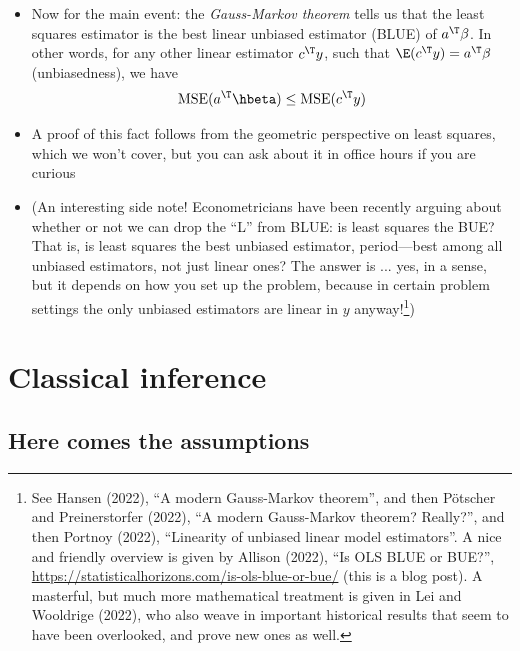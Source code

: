 \documentclass{article}
\begin{document}
\begin{itemize}
\item Now for the main event: the \emph{Gauss-Markov theorem} tells us that
  the least squares estimator is the best linear unbiased estimator (BLUE) of
  $a^\T \beta$. In other words, for any other linear estimator $c^\T y$, such
  that $\E(c^\T y) = a^\T \beta$ (unbiasedness), we have  
  \[
  \MSE(a^\T \hbeta) \leq \MSE(c^\T y)
  \]

\item A proof of this fact follows from the geometric perspective on least
  squares, which we won't cover, but you can ask about it in office hours if you
  are curious  

\item (An interesting side note! Econometricians have been recently arguing about 
  whether or not we can drop the ``L'' from BLUE: is least squares the BUE? That
  is, is least squares the best unbiased estimator, period---best among all
  unbiased estimators, not just linear ones? The answer is ... yes, in a sense,
  but it depends on how you set up the problem, because in certain problem
  settings the only unbiased estimators are linear in $y$ anyway!\footnote{See
    Hansen (2022), ``A modern Gauss-Markov theorem'', and then P{\"o}tscher and
    Preinerstorfer (2022), ``A modern Gauss-Markov theorem? Really?'', and then
    Portnoy (2022), ``Linearity  of unbiased linear model estimators''. A nice
    and friendly overview is given by Allison (2022), ``Is OLS BLUE or BUE?'',
    \url{https://statisticalhorizons.com/is-ols-blue-or-bue/} (this is a blog
    post). A masterful, but much more mathematical treatment is given in Lei and
    Wooldrige (2022), who also weave in important historical results that seem
    to have been overlooked, and prove new ones as well.})  
\end{itemize}

\section{Classical inference}

\subsection{Here comes the assumptions}

\def\iidsim{\overset{\text{iid}}{\sim}}
\end{document}
